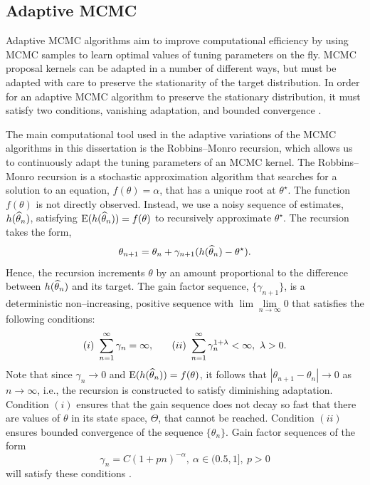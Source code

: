 \subsection{Adaptive MCMC}
\label{subsec:adaptive_mcmc}

Adaptive MCMC algorithms aim to improve computational efficiency by using MCMC samples to learn optimal values of tuning parameters on the fly. MCMC proposal kernels can be adapted in a number of different ways, but must be adapted with care to preserve the stationarity of the target distribution. In order for an adaptive MCMC algorithm to preserve the stationary distribution, it must satisfy two conditions, vanishing adaptation, and bounded convergence \cite{andrieu2008tutorial}.

The main computational tool used in the adaptive variations of the MCMC algorithms in this dissertation is the Robbins--Monro recursion, which allows us to continuously adapt the tuning parameters of an MCMC kernel. The Robbins--Monro recursion is a stochastic approximation algorithm that searches for a solution to an equation, $ f(\theta) = \alpha $, that has a unique root at $ \theta^\star $. The function $ f(\theta) $ is not directly observed. Instead, we use a noisy sequence of estimates, $ h(\widehat{\theta}_n) $, satisfying $ \mathrm{E}(h(\widehat{\theta}_n)) = f(\theta) $ to recursively approximate $ \theta^\star $. The recursion takes the form, $$\theta_{n+1} = \theta_n + \gamma_{n+1}(h(\widehat{\theta}_n) - \theta^\star).$$
Hence, the recursion increments $ \theta $ by an amount proportional to the difference between $ h(\widehat{\theta}_n) $ and its target.  The gain factor sequence, $ \lbrace\gamma_{n+1}\rbrace $, is a deterministic non--increasing, positive sequence with $ \lim\lim\limits_{n\rightarrow\infty}0 $  that satisfies the following conditions: $$(i)\ \sum_{n=1}^\infty \gamma_n = \infty,\hspace{0.25in} (ii)\  \sum_{n=1}^\infty\gamma_n^{1+\lambda} < \infty,\ \lambda > 0.$$
Note that since $ \gamma_n\rightarrow0 $ and $ \mathrm{E}(h(\widehat{\theta}_n))= f(\theta) $, it follows that $ |\theta_{n+1} - \theta_n|\rightarrow0 $ as $ n\rightarrow\infty $, i.e., the recursion is constructed to satisfy diminishing adaptation. Condition $ (i) $ ensures that the gain sequence does not decay so fast that there are values of $ \theta $ in its state space, $ \Theta $, that cannot be reached. Condition $ (ii) $ ensures bounded convergence of the sequence $ \lbrace\theta_n\rbrace $. Gain factor sequences of the form \begin{equation}
\label{eqn:gain_factor_seq}
 \gamma_n = C(1+pn)^{-\alpha},\ \alpha\in(0.5,1],\ p>0
\end{equation}  will satisfy these conditions \cite{andrieu2008tutorial,liang2011advanced}. 

